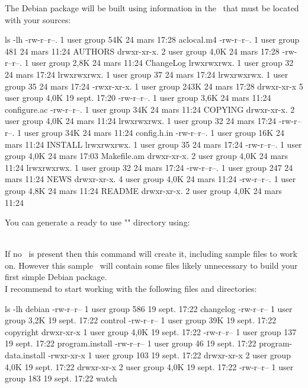 The Debian package will be built using information in the \ddir\ that must be located with your sources:
{\footnotesize{
\begin{script}
 ls -lh
-rw-r--r--.  1 user group  54K 24 mars  17:28 aclocal.m4
-rw-r--r--.  1 user group  481 24 mars  11:24 AUTHORS
drwxr-xr-x.  2 user group 4,0K 24 mars  17:28 
-rw-r--r--.  1 user group 2,8K 24 mars  11:24 ChangeLog
lrwxrwxrwx.  1 user group   32 24 mars  17:24 
lrwxrwxrwx.  1 user group   37 24 mars  17:24 
lrwxrwxrwx.  1 user group   35 24 mars  17:24 
-rwxr-xr-x.  1 user group 243K 24 mars  17:28 
drwxr-xr-x   5 user group 4,0K 19 sept. 17:20 
-rw-r--r--.  1 user group 3,6K 24 mars  11:24 configure.ac
-rw-r--r--.  1 user group  34K 24 mars  11:24 COPYING
drwxr-xr-x.  2 user group 4,0K 24 mars  11:24 
lrwxrwxrwx.  1 user group   32 24 mars  17:24 
-rw-r--r--.  1 user group  34K 24 mars  11:24 config.h.in
-rw-r--r--.  1 user group  16K 24 mars  11:24 INSTALL
lrwxrwxrwx.  1 user group   35 24 mars  17:24 
-rw-r--r--.  1 user group 4,0K 24 mars  17:03 Makefile.am
drwxr-xr-x.  2 user group 4,0K 24 mars  11:24 
lrwxrwxrwx.  1 user group   32 24 mars  17:24 
-rw-r--r--.  1 user group  247 24 mars  11:24 NEWS
drwxr-xr-x.  4 user group 4,0K 24 mars  11:24 
-rw-r--r--.  1 user group 4,8K 24 mars  11:24 README
drwxr-xr-x.  2 user group 4,0K 24 mars  11:24 
\end{script}
}}
\noindent You can generate a ready to use "" directory using:
{\footnotesize{
\begin{script}
 
\end{script}
}}
\\[-0.5cm]
\noindent If no \ddir\ is present then this command will create it, including sample files to work on. 
However this sample \ddir\ will contain some files likely unnecessary to build your first simple Debian package. \\[0.25cm]
I recommend to start working with the following files and directories:
{\footnotesize{
\begin{script}
 ls -lh debian
-rw-r--r-- 1 user group  586 19 sept. 17:22 changelog
-rw-r--r-- 1 user group 3,2K 19 sept. 17:22 control
-rw-r--r-- 1 user group  39K 19 sept. 17:22 copyright
drwxr-xr-x 1 user group 4,0K 19 sept. 17:22 
-rw-r--r-- 1 user group  137 19 sept. 17:22 program.install
-rw-r--r-- 1 user group   46 19 sept. 17:22 program-data.install
-rwxr-xr-x 1 user group  103 19 sept. 17:22 
drwxr-xr-x 2 user group 4,0K 19 sept. 17:22 
drwxr-xr-x 2 user group 4,0K 19 sept. 17:22 
-rw-r--r-- 1 user group  183 19 sept. 17:22 watch
\end{script}
}}
